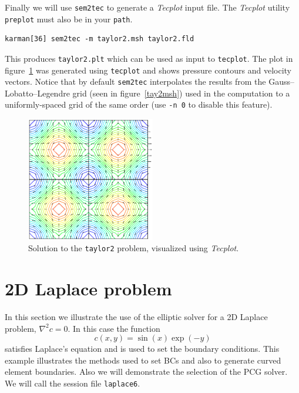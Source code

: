 \documentclass[11pt,a4paper]{report}
\begin{document}
Finally we will use \texttt{sem2tec} to generate a \emph{Tecplot}
input file.  The \emph{Tecplot} utility \texttt{preplot} must also be
in your \texttt{path}.  {\small
\begin{verbatim}
karman[36] sem2tec -m taylor2.msh taylor2.fld
\end{verbatim}
}
\noindent
This produces \texttt{taylor2.plt} which can be used as input to
\texttt{tecplot}.  The plot in figure~\ref{tay2soln} was generated
using \texttt{tecplot} and shows pressure contours and velocity
vectors.  Notice that by default \texttt{sem2tec} interpolates the
results from the Gauss--Lobatto--Legendre grid (seen in
figure~\ref{tay2msh}) used in the computation to a uniformly-spaced
grid of the same order (use \verb|-n 0| to disable this feature).
\begin{figure}
\begin{center}
\includegraphics[width=0.5\textwidth]{taylor2.eps}
\end{center}
\caption{
\label{tay2soln}
  Solution to the \texttt{taylor2} problem, visualized using \emph{Tecplot}.
}
\end{figure}

\section{2D Laplace problem}

In this section we illustrate the use of the elliptic solver for a 2D
Laplace problem, $\nabla^2 c = 0$.  In this case the function
\begin{equation}
  c(x,y) = \sin(x) \exp(-y)
\end{equation}
satisfies Laplace's equation and is used to set the boundary
conditions.  This example illustrates the methods used to set BCs and
also to generate curved element boundaries.  Also we will demonstrate
the selection of the PCG solver.  We will call the session file
\texttt{laplace6}.
\end{document}

